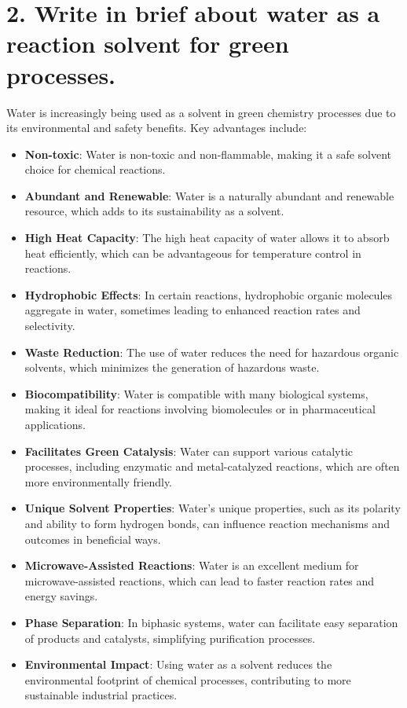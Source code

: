 \documentclass[11pt]{article}
\begin{document}
\section{2. Write in brief about water as a reaction solvent for green processes.}
Water is increasingly being used as a solvent in green chemistry processes due to its environmental and safety benefits. Key advantages include:
\begin{itemize}
    \item \textbf{Non-toxic}: Water is non-toxic and non-flammable, making it a safe solvent choice for chemical reactions.
    \item \textbf{Abundant and Renewable}: Water is a naturally abundant and renewable resource, which adds to its sustainability as a solvent.
    \item \textbf{High Heat Capacity}: The high heat capacity of water allows it to absorb heat efficiently, which can be advantageous for temperature control in reactions.
    \item \textbf{Hydrophobic Effects}: In certain reactions, hydrophobic organic molecules aggregate in water, sometimes leading to enhanced reaction rates and selectivity.
    \item \textbf{Waste Reduction}: The use of water reduces the need for hazardous organic solvents, which minimizes the generation of hazardous waste.
    \item \textbf{Biocompatibility}: Water is compatible with many biological systems, making it ideal for reactions involving biomolecules or in pharmaceutical applications.
    \item \textbf{Facilitates Green Catalysis}: Water can support various catalytic processes, including enzymatic and metal-catalyzed reactions, which are often more environmentally friendly.
    \item \textbf{Unique Solvent Properties}: Water's unique properties, such as its polarity and ability to form hydrogen bonds, can influence reaction mechanisms and outcomes in beneficial ways.
    \item \textbf{Microwave-Assisted Reactions}: Water is an excellent medium for microwave-assisted reactions, which can lead to faster reaction rates and energy savings.
    \item \textbf{Phase Separation}: In biphasic systems, water can facilitate easy separation of products and catalysts, simplifying purification processes.
    \item \textbf{Environmental Impact}: Using water as a solvent reduces the environmental footprint of chemical processes, contributing to more sustainable industrial practices.

\end{itemize}
\end{document}
